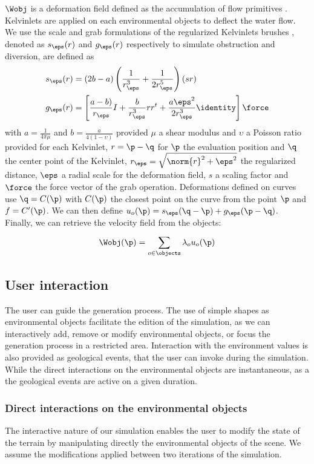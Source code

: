 $\Wobj$ is a deformation field defined as the accumulation of flow primitives \cite{Wejchert1991}. Kelvinlets are applied on each environmental objects to deflect the water flow. We use the scale and grab formulations of the regularized Kelvinlets brushes \cite{DeGoes2017}, denoted as $s_\eps(r)$ and $g_\eps(r)$ respectively to simulate obstruction and diversion, are defined as
\begin{align*}
    s_\eps(r) &= (2b - a) \left (\frac{1}{r_\eps^3} + \frac{1}{2r_\eps^5} \right)(s r) \\
    g_\eps(r) &= \left[ \frac{a - b)}{r_\eps}I + \frac{b}{r_\eps^3} r r^t + 
\frac{a \eps^2}{2 r_\eps^3} \identity \right] \force
\end{align*}
with $a = \frac{1}{4 \pi \mu}$ and $b = \frac{a}{4 (1 - \upsilon)}$ provided $\mu$ a shear modulus and $\upsilon$ a Poisson ratio provided for each Kelvinlet, $r = \p - \q$ for $\p$ the evaluation position and $\q$ the center point of the Kelvinlet, $r_\eps = \sqrt{\norm{r}^2 + \eps^2}$ the regularized distance, $\eps$ a radial scale for the deformation field, $s$ a scaling factor and $\force$ the force vector of the grab operation.
Deformations defined on curves use $\q = C(\p)$ with $C(\p)$ the closest point on the curve from the point $\p$ and $f = C'(\p)$. We can then define $u_o(\p) = s_\eps(\q - \p) + g_\eps(\p - \q)$. \\
Finally, we can retrieve the velocity field from the objects:
\begin{align*}
    \Wobj(\p) = \sum_{o \in \objects}^{}{\lambda_o u_o(\p)}
\end{align*}


\subsection{User interaction}
\label{EnvironmentObjects-sec:interaction}
The user can guide the generation process. The use of simple shapes as environmental objects facilitate the edition of the simulation, as we can interactively add, remove or modify environmental objects, or focus the generation process in a restricted area. Interaction with the environment values is also provided as geological events, that the user can invoke during the simulation. While the direct interactions on the environmental objects are instantaneous, as a the geological events are active on a given duration.

\subsubsection{Direct interactions on the environmental objects}
\label{EnvironmentObjects-sec:manual-interaction}
The interactive nature of our simulation enables the user to modify the state of the terrain by manipulating directly the environmental objects of the scene. We assume the modifications applied between two iterations of the simulation.

